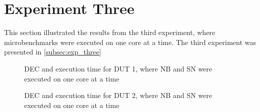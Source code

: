 \section{Experiment Three}\label{app:exp_three}

This section illustrated the results from the third experiment, where microbenchmarks were executed on one core at a time. The third experiment was presented in \cref{subsec:exp_three}


\begin{figure}[H]
    \centering
    \begin{subfigure}[b]{0.4\textwidth}
        \centering
        
    \end{subfigure}
    \hfill
    \begin{subfigure}[b]{0.4\textwidth}
        \centering
        
    \end{subfigure}
    \caption{DEC and execution time for DUT 1, where NB and SN were executed on one core at a time}
\end{figure}

\begin{figure}[H]
    \centering
    \begin{subfigure}[b]{0.4\textwidth}
        \centering
        
    \end{subfigure}
    \hfill
    \begin{subfigure}[b]{0.4\textwidth}
        \centering
        
    \end{subfigure}
    \caption{DEC and execution time for DUT 2, where NB and SN were executed on one core at a time}
\end{figure}


% 


% 

